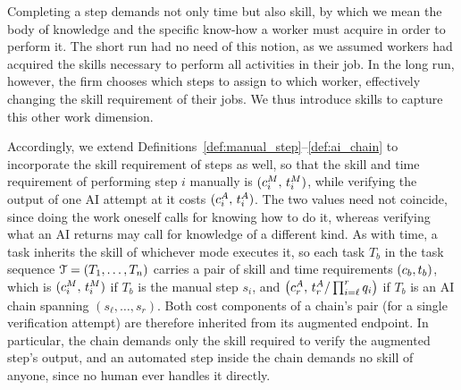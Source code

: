 Completing a step demands not only time but also skill, by which we mean the body of knowledge and the specific know-how a worker must acquire in order to perform it.
The short run had no need of this notion, as we assumed workers had acquired the skills necessary to perform all activities in their job.
In the long run, however, the firm chooses which steps to assign to which worker, effectively changing the skill requirement of their jobs.
We thus introduce skills to capture this other work dimension.

Accordingly, we extend Definitions~\ref{def:manual_step}--\ref{def:ai_chain} to incorporate the skill requirement of steps as well, so that 
the skill and time requirement of performing step $i$ manually is $(c^{M}_{i},\, t^{M}_{i})$, while verifying the output of one AI attempt at it costs $(c^{A}_{i},\, t^{A}_{i})$.
The two values need not coincide, since doing the work oneself calls for knowing how to do it, whereas verifying what an AI returns may call for knowledge of a different kind.
As with time, a task inherits the skill of whichever mode executes it, so each task $T_b$ in the task sequence $\mathcal{T} = (T_1, \dotsc, T_n)$ carries a pair of skill and time requirements $(c_{b}, t_{b})$, which is $(c^{M}_{i},\, t^{M}_{i})$ if $T_b$ is the manual step $s_i$, and $\bigl(c^{A}_{r},\, t^{A}_{r}/\prod_{i=\ell}^{r} q_i\bigr)$ if $T_b$ is an AI chain spanning $(s_\ell, \dotsc, s_r)$.
Both cost components of a chain's pair (for a single verification attempt) are therefore inherited from its augmented endpoint.
In particular, the chain demands only the skill required to verify the augmented step's output, and an automated step inside the chain demands no skill of anyone, since no human ever handles it directly.

